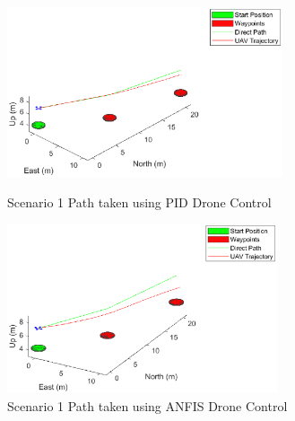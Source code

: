 \begin{figure}[H]
    \centering
    \begin{minipage}[b]{0.45\textwidth}
        \includegraphics[height=5cm,keepaspectratio]{img/scenario1_pid_paths.eps}
        \caption{Scenario 1 Path taken using PID Drone Control}
        \label{fig:Paths1_pid}
    \end{minipage}
    \hfill
    \begin{minipage}[b]{0.45\textwidth}
        \includegraphics[height=5cm,keepaspectratio]{img/scenario1_fis_paths.eps}
        \caption{Scenario 1 Path taken using ANFIS Drone Control}
        \label{fig:Paths1_fis}
    \end{minipage}
\end{figure}
